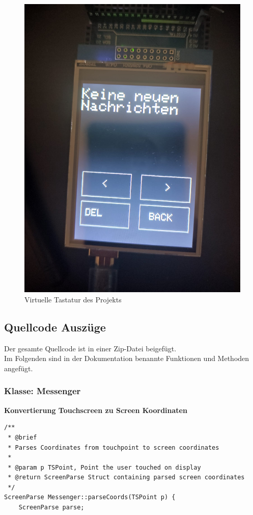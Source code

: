\documentclass[a4paper, 11pt]{scrartcl}
\begin{document}
\begin{small}
\begin{figure}[H]
    \begin{center}
        \includegraphics[scale=0.13]{Bilder/read_menu.jpeg}
        \caption{Virtuelle Tastatur des Projekts}\label{pic:read_menu}
    \end{center}
\end{figure}

\newpage
\subsection{Quellcode Auszüge}\label{ch:codeschnipsel}
Der gesamte Quellcode ist in einer Zip-Datei beigefügt.
\\
Im Folgenden sind in der Dokumentation benannte Funktionen und Methoden angefügt.

\subsubsection{Klasse: Messenger}
\textbf{Konvertierung Touchscreen zu Screen Koordinaten}\label{code:screenparse}
\begin{lstlisting}
/**
 * @brief 
 * Parses Coordinates from touchpoint to screen coordinates
 * 
 * @param p TSPoint, Point the user touched on display
 * @return ScreenParse Struct containing parsed screen coordinates
 */
ScreenParse Messenger::parseCoords(TSPoint p) {
    ScreenParse parse;
    

\end{lstlisting}
\end{small}
\end{document}
